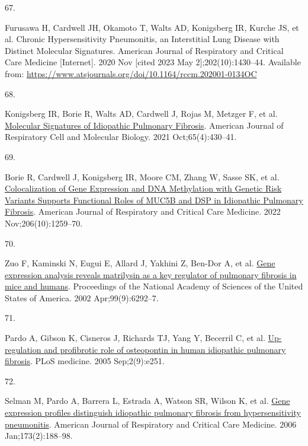 \documentclass[
]{article}
\newlength{\cslhangindent}
\newlength{\csllabelwidth}
\newenvironment{CSLReferences}[2] %
 {\begin{list}{}{%
  \setlength{\itemindent}{0pt}
  \setlength{\leftmargin}{0pt}
  \setlength{\parsep}{0pt}
  \ifodd #1
   \setlength{\leftmargin}{\cslhangindent}
   \setlength{\itemindent}{-1\cslhangindent}
  \fi
  \setlength{\itemsep}{#2\baselineskip}}}
 {\end{list}}
\newcommand{\CSLLeftMargin}[1]{\parbox[t]{\csllabelwidth}{\strut#1\strut}}
\newcommand{\CSLRightInline}[1]{\parbox[t]{\linewidth - \csllabelwidth}{\strut#1\strut}}
\begin{document}
\begin{CSLReferences}{0}{1}
\CSLLeftMargin{67. }%
\CSLRightInline{Furusawa H, Cardwell JH, Okamoto T, Walts AD, Konigsberg IR, Kurche JS, et al. Chronic {Hypersensitivity} {Pneumonitis}, an {Interstitial} {Lung} {Disease} with {Distinct} {Molecular} {Signatures}. American Journal of Respiratory and Critical Care Medicine {[}Internet{]}. 2020 Nov {[}cited 2023 May 2{]};202(10):1430--44. Available from: \url{https://www.atsjournals.org/doi/10.1164/rccm.202001-0134OC}}

\CSLLeftMargin{68. }%
\CSLRightInline{Konigsberg IR, Borie R, Walts AD, Cardwell J, Rojas M, Metzger F, et al. \href{https://doi.org/10.1165/rcmb.2020-0546OC}{Molecular {Signatures} of {Idiopathic} {Pulmonary} {Fibrosis}}. American Journal of Respiratory Cell and Molecular Biology. 2021 Oct;65(4):430--41. }

\CSLLeftMargin{69. }%
\CSLRightInline{Borie R, Cardwell J, Konigsberg IR, Moore CM, Zhang W, Sasse SK, et al. \href{https://doi.org/10.1164/rccm.202110-2308OC}{Colocalization of {Gene} {Expression} and {DNA} {Methylation} with {Genetic} {Risk} {Variants} {Supports} {Functional} {Roles} of {MUC5B} and {DSP} in {Idiopathic} {Pulmonary} {Fibrosis}}. American Journal of Respiratory and Critical Care Medicine. 2022 Nov;206(10):1259--70. }

\CSLLeftMargin{70. }%
\CSLRightInline{Zuo F, Kaminski N, Eugui E, Allard J, Yakhini Z, Ben-Dor A, et al. \href{https://doi.org/10.1073/pnas.092134099}{Gene expression analysis reveals matrilysin as a key regulator of pulmonary fibrosis in mice and humans}. Proceedings of the National Academy of Sciences of the United States of America. 2002 Apr;99(9):6292--7. }

\CSLLeftMargin{71. }%
\CSLRightInline{Pardo A, Gibson K, Cisneros J, Richards TJ, Yang Y, Becerril C, et al. \href{https://doi.org/10.1371/journal.pmed.0020251}{Up-regulation and profibrotic role of osteopontin in human idiopathic pulmonary fibrosis}. PLoS medicine. 2005 Sep;2(9):e251. }

\CSLLeftMargin{72. }%
\CSLRightInline{Selman M, Pardo A, Barrera L, Estrada A, Watson SR, Wilson K, et al. \href{https://doi.org/10.1164/rccm.200504-644OC}{Gene expression profiles distinguish idiopathic pulmonary fibrosis from hypersensitivity pneumonitis}. American Journal of Respiratory and Critical Care Medicine. 2006 Jan;173(2):188--98. }


\end{CSLReferences}
\end{document}
